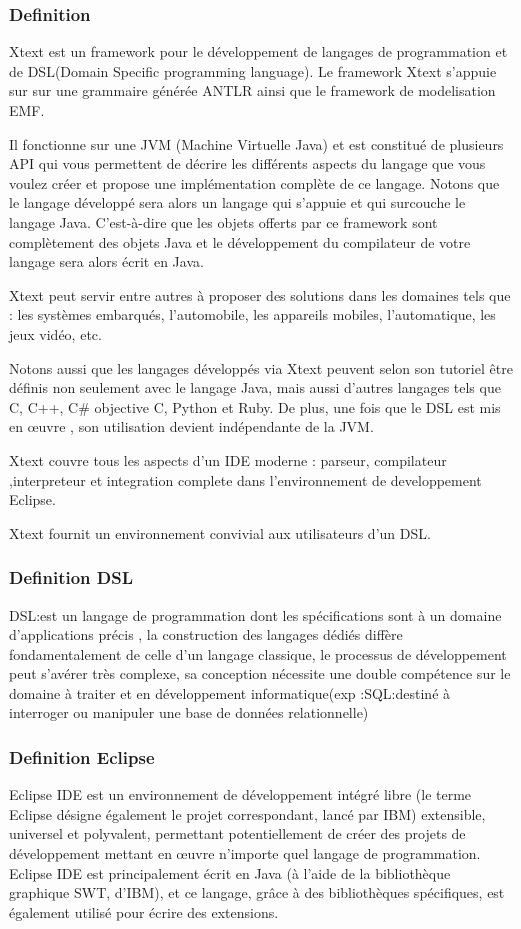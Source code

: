 \documentclass{article}
\begin{document}
{\subsubsection{Definition}
Xtext est un framework pour le développement de langages de programmation et de DSL(Domain Specific programming language).
Le framework Xtext s’appuie sur sur une grammaire générée ANTLR ainsi que le framework de modelisation EMF.

Il fonctionne sur une JVM (Machine Virtuelle Java) et est constitué de plusieurs API qui vous permettent de décrire les différents aspects du langage que vous voulez créer et propose une implémentation complète de ce langage. Notons que le langage développé sera alors un langage qui s'appuie et qui surcouche le langage Java. C'est-à-dire que les objets offerts par ce framework sont complètement des objets Java et le développement du compilateur de votre langage sera alors écrit en Java.

Xtext peut servir entre autres à proposer des solutions dans les domaines tels que : les systèmes embarqués, l'automobile, les appareils mobiles, l'automatique, les jeux vidéo, etc.

Notons aussi que les langages développés via Xtext peuvent selon son tutoriel être définis non seulement avec le langage Java, mais aussi d'autres langages tels que C, C++, C# objective C, Python et Ruby. De plus, une fois que le DSL est mis en œuvre , son utilisation devient indépendante de la JVM. 

Xtext couvre tous les aspects d’un IDE moderne : parseur, compilateur ,interpreteur et integration complete dans l’environnement de developpement Eclipse.

Xtext fournit un environnement convivial aux utilisateurs d’un DSL.

\subsubsection{Definition DSL}
DSL:est un langage de programmation dont les spécifications sont à un domaine d’applications précis , la construction des langages dédiés diffère fondamentalement de celle d’un langage classique, le processus de développement  peut s'avérer très complexe, sa conception nécessite une double compétence sur le domaine à traiter et en développement informatique(exp :SQL:destiné à interroger ou manipuler une base de données relationnelle)

\subsubsection{Definition Eclipse}
Eclipse IDE est un environnement de développement intégré libre (le terme Eclipse désigne également le projet correspondant, lancé par IBM) extensible, universel et polyvalent, permettant potentiellement de créer des projets de développement mettant en œuvre n'importe quel langage de programmation. Eclipse IDE est principalement écrit en Java (à l'aide de la bibliothèque graphique SWT, d'IBM), et ce langage, grâce à des bibliothèques spécifiques, est également utilisé pour écrire des extensions.

}
\end{document}
